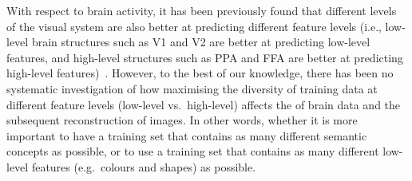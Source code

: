 With respect to  brain activity, it has been previously found that different levels of the visual system are also better at predicting different feature levels (i.e., low-level brain structures such as V1 and V2 are better at predicting low-level features, and high-level structures such as PPA and FFA are better at predicting high-level features)~\cite{horikawaGenericDecodingSeen2017}. However, to the best of our knowledge, there has been no systematic investigation of how maximising the diversity of training data at different feature levels (low-level vs.\ high-level) affects the  of brain data and the subsequent reconstruction of images. In other words, whether it is more important to have a training set that contains as many different semantic concepts as possible, or to use a training set that contains as many different low-level features (e.g.\ colours and shapes) as possible. 





